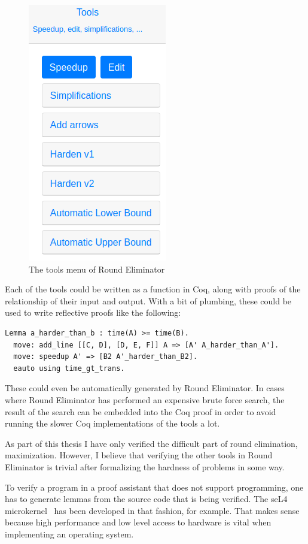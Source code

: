 \documentclass[english, 12pt, a4paper, sci, a-1b, online]{aaltothesis}
\begin{document}
\begin{figure}[h]
  \centering
  \includegraphics[scale=0.5]{retools}
  \caption{The tools menu of Round Eliminator}
\end{figure}

Each of the tools could be written as a function in Coq, along with proofs of the relationship of their input and output. With a bit of plumbing, these could be used to write reflective proofs like the following:

\begin{verbatim}
Lemma a_harder_than_b : time(A) >= time(B).
  move: add_line [[C, D], [D, E, F]] A => [A' A_harder_than_A'].
  move: speedup A' => [B2 A'_harder_than_B2].
  eauto using time_gt_trans.
\end{verbatim}

These could even be automatically generated by Round Eliminator. In cases where Round Eliminator has performed an expensive brute force search, the result of the search can be embedded into the Coq proof in order to avoid running the slower Coq implementations of the tools a lot.

As part of this thesis I have only verified the difficult part of round elimination, maximization. However, I believe that verifying the other tools in Round Eliminator is trivial after formalizing the hardness of problems in some way.

To verify a program in a proof assistant that does not support programming, one has to generate lemmas from the source code that is being verified. The seL4 microkernel~\cite{sel4} has been developed in that fashion, for example. That makes sense because high performance and low level access to hardware is vital when implementing an operating system.
\end{document}
